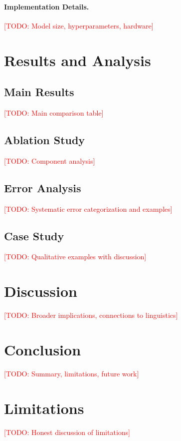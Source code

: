 \documentclass[11pt]{article}
\newcommand{\todo}[1]{\textcolor{red}{[TODO: #1]}}
\begin{document}
\paragraph{Implementation Details.}
\todo{Model size, hyperparameters, hardware}

\section{Results and Analysis}
\label{sec:results}

\subsection{Main Results}
\todo{Main comparison table}

\subsection{Ablation Study}
\todo{Component analysis}

\subsection{Error Analysis}
\todo{Systematic error categorization and examples}

\subsection{Case Study}
\todo{Qualitative examples with discussion}

\section{Discussion}
\label{sec:discussion}
\todo{Broader implications, connections to linguistics}

\section{Conclusion}
\label{sec:conclusion}
\todo{Summary, limitations, future work}

\section*{Limitations}
\todo{Honest discussion of limitations}
\end{document}
